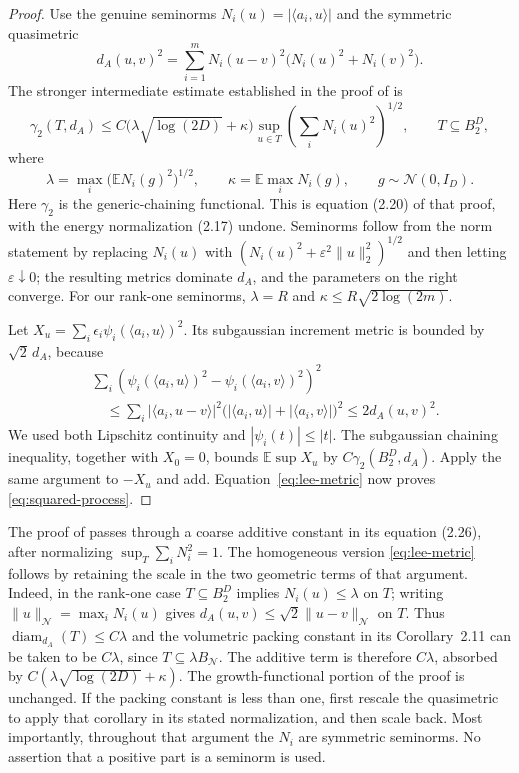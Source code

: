 \begin{proof}
Use the genuine seminorms $N_i(u)=|\langle a_i,u\rangle|$ and the
symmetric quasimetric
\[
 d_A(u,v)^2
 =\sum_{i=1}^m N_i(u-v)^2\bigl(N_i(u)^2+N_i(v)^2\bigr).
\]
The stronger intermediate estimate established in the proof of
\cite[Lemma~2.12]{Lee2023} is
\begin{equation}\label{eq:lee-metric}
 \gamma_2(T,d_A)
 \le C\bigl(\lambda\sqrt{\log(2D)}+\kappa\bigr)
       \sup_{u\in T}\left(\sum_i N_i(u)^2\right)^{1/2},
 \qquad T\subseteq B_2^D,
\end{equation}
where
\[
 \lambda=\max_i\bigl(\mathbb E N_i(g)^2\bigr)^{1/2},
 \qquad \kappa=\mathbb E\max_i N_i(g),
 \qquad g\sim\mathcal N(0,I_D).
\]
Here $\gamma_2$ is the generic-chaining functional. This is equation
(2.20) of that proof, with the energy normalization (2.17) undone.
Seminorms follow from the norm statement by replacing
$N_i(u)$ with $(N_i(u)^2+\varepsilon^2\|u\|_2^2)^{1/2}$ and then
letting $\varepsilon\downarrow0$; the resulting metrics dominate
$d_A$, and the parameters on the right converge.
For our rank-one seminorms,
$\lambda=R$ and $\kappa\le R\sqrt{2\log(2m)}$.

Let $X_u=\sum_i\epsilon_i\psi_i(\langle a_i,u\rangle)^2$.
Its subgaussian increment metric is bounded by $\sqrt2\,d_A$, because
\begin{align*}
 &\sum_i\left(\psi_i(\langle a_i,u\rangle)^2
             -\psi_i(\langle a_i,v\rangle)^2\right)^2\\
 &\quad\le\sum_i |\langle a_i,u-v\rangle|^2
       \bigl(|\langle a_i,u\rangle|+|\langle a_i,v\rangle|\bigr)^2
 \le 2d_A(u,v)^2.
\end{align*}
We used both Lipschitz continuity and
$|\psi_i(t)|\le|t|$. The subgaussian chaining inequality, together
with $X_0=0$, bounds $\mathbb E\sup X_u$ by
$C\gamma_2(B_2^D,d_A)$. Apply the same argument to $-X_u$ and add.
Equation~\eqref{eq:lee-metric} now proves
\eqref{eq:squared-process}.
\end{proof}

\begin{remark}
The proof of \cite[Lemma~2.12]{Lee2023} passes through a coarse additive
constant in its equation (2.26), after normalizing
$\sup_T\sum_iN_i^2=1$. The homogeneous version
\eqref{eq:lee-metric} follows by retaining the scale in the two geometric
terms of that argument. Indeed, in the rank-one case $T\subseteq B_2^D$
implies $N_i(u)\le\lambda$ on $T$; writing
$\|u\|_{\mathcal N}=\max_iN_i(u)$ gives
$d_A(u,v)\le\sqrt2\|u-v\|_{\mathcal N}$ on $T$.
Thus $\operatorname{diam}_{d_A}(T)\le C\lambda$ and the volumetric
packing constant in its Corollary~2.11 can be taken to be
$C\lambda$, since $T\subseteq\lambda B_{\mathcal N}$.
The additive term is therefore $C\lambda$, absorbed by
$C(\lambda\sqrt{\log(2D)}+\kappa)$.
The growth-functional portion of the proof is unchanged.
If the packing constant is less than one, first rescale the quasimetric
to apply that corollary in its stated normalization, and then scale back.
Most importantly, throughout that argument the $N_i$ are symmetric
seminorms. No assertion that a positive part is a seminorm is used.
\end{remark}

